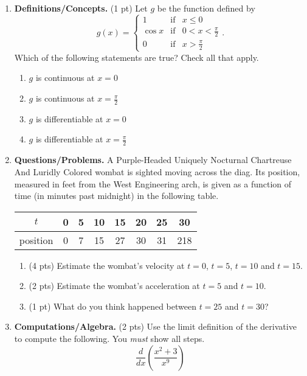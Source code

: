 \documentclass[11pt,letterpaper]{article}
\begin{document}
\begin{enumerate}
\item  \textbf{Definitions/Concepts.} (1 pt) 
Let $g$ be the function defined by
\[ g(x)=\left\{\begin{array}{lcl}
              1 & \text{if} & x\leq 0 \\
              \cos x & \text{if} & 0 < x < \frac{\pi}{2} \\
              0 & \text{if} & x > \frac{\pi}{2}
             \end{array}\right..
 \]
Which of the following statements are true? Check all
that apply.
\begin{enumerate}
 \item $g$ is continuous at $x=0$ 
 \item $g$ is continuous at $x=\frac{\pi}{2}$ 
 \item $g$ is differentiable at $x=0$ 
 \item $g$ is differentiable at $x=\frac{\pi}{2}$
\end{enumerate}

\vspace{1pc}
\item \textbf{Questions/Problems.} 
\noindent
A Purple-Headed Uniquely Nocturnal Chartreuse And
Luridly Colored
wombat is sighted moving across the diag. Its position,
measured in
feet from the West Engineering arch, is given as a
function of time
(in minutes past midnight) in the following table.
\smallskip
\begin{center}
\begin{tabular}{c|ccccccc}
$t$ & 0 & 5 & 10 & 15 & 20 & 25 & 30 \\
\hline
position & 0 & 7 & 15 & 27 & 30 & 31 & 218
\end{tabular}
\end{center}
\begin{enumerate}
\item (4 pts)
Estimate the wombat's velocity at $t=0$, $t=5$, $t=10$
and $t=15$.

\vspace{6pc}
\item (2 pts)
Estimate the wombat's acceleration at $t=5$ and $t=10$.

\vspace{4pc}
\item (1 pt)
What do you think happened between $t=25$ and $t=30$?
\end{enumerate}

\vspace{2pc}
\item \textbf{Computations/Algebra.} (2 pts) Use the limit definition of the derivative to compute the following.  You \emph{must} show all steps.
\[\frac{d}{dx}\left(\frac{x^2+3}{x^9}\right)\]

\end{enumerate}
\end{document}

